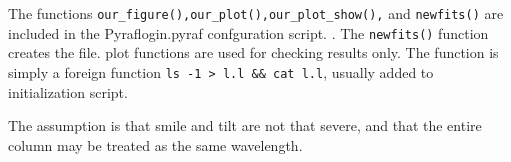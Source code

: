 The functions \verb=our_figure(),our_plot(),our_plot_show(),= and \verb=newfits()=
are included in the Pyraflogin.pyraf confguration script.
   . The \verb=newfits()= function creates the  file.
plot functions are used for checking results only. The function  is simply
a foreign function \verb=ls -1 > l.l && cat l.l=, usually added to 
initialization script.

The assumption is that smile and tilt are not that severe, and that the entire column
may be treated as the same wavelength.
